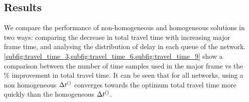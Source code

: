 
\subsection{Results}

We compare the performance of non-homogeneous and homogeneous solutions in two ways: comparing the decrease in total travel time with increasing major frame time, and analysing the distribution of delay in each queue of the network. \cref{subfig:travel_time_3,subfig:travel_time_6,subfig:travel_time_9} show a comparison between the number of time samples used in the major frame vs the \% improvement in total travel time. It can be seen that for all networks, using a non homogeneous $\DT[]$ converges towards the optimum total travel time more quickly than the homogeneous $\DT[]$. 

